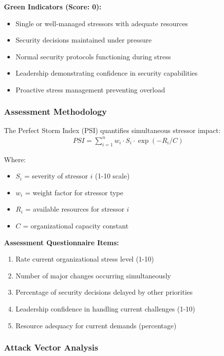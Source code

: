 \documentclass[11pt,a4paper]{article}
\begin{document}
\textbf{Green Indicators (Score: 0):}
\begin{itemize}
\item Single or well-managed stressors with adequate resources
\item Security decisions maintained under pressure
\item Normal security protocols functioning during stress
\item Leadership demonstrating confidence in security capabilities
\item Proactive stress management preventing overload
\end{itemize}

\subsubsection{Assessment Methodology}

The Perfect Storm Index (PSI) quantifies simultaneous stressor impact:
\begin{align}
PSI = \sum_{i=1}^{n} w_i \cdot S_i \cdot \exp(-R_i/C)
\end{align}

Where:
\begin{itemize}
\item $S_i$ = severity of stressor $i$ (1-10 scale)
\item $w_i$ = weight factor for stressor type
\item $R_i$ = available resources for stressor $i$
\item $C$ = organizational capacity constant
\end{itemize}

\textbf{Assessment Questionnaire Items:}
\begin{enumerate}
\item Rate current organizational stress level (1-10)
\item Number of major changes occurring simultaneously
\item Percentage of security decisions delayed by other priorities
\item Leadership confidence in handling current challenges (1-10)
\item Resource adequacy for current demands (percentage)
\end{enumerate}

\subsubsection{Attack Vector Analysis}
\end{document}
